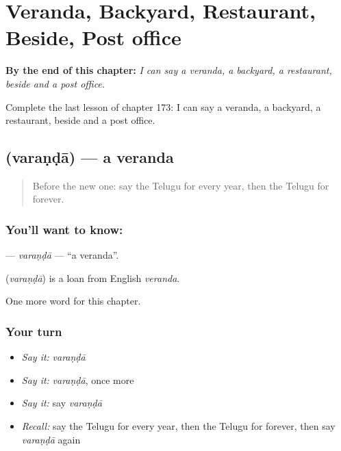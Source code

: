 
\chapter{Veranda, Backyard, Restaurant, Beside, Post office}
\label{ch:te-veranda-backyard-restaurant-beside-post-office}

\begin{chapteropening}
\textbf{By the end of this chapter:} \emph{I can say a veranda, a backyard, a restaurant, beside and a post office.}

Complete the last lesson of chapter 173: I can say a veranda, a backyard, a restaurant, beside and a post office.
\end{chapteropening}

\section[\texorpdfstring{\te{వరండా} (varaṇḍā)}{వరండా (varaṇḍā)}]{ (varaṇḍā) — a veranda}

\label{lesson:TE-C173-varanda}



\begin{quote}
Before the new one: say the Telugu for every year, then the Telugu for forever.
\end{quote}

\subsection*{You'll want to know: }
\textbf{} — \emph{varaṇḍā} — \textquotedblleft{}a veranda\textquotedblright{}.

\begin{cousinweb}
\textbf{} (\emph{varaṇḍā}) is a loan from English \emph{veranda}.
\end{cousinweb}

\begin{grammarlens}[title={What you've built}]
One more word for this chapter.
\end{grammarlens}

\subsection*{Your turn}
\begin{itemize}
\raggedright
  \item \emph{Say it:} \emph{varaṇḍā}
  \item \emph{Say it:} \emph{varaṇḍā}, once more
  \item \emph{Say it:} say \emph{varaṇḍā}
  \item \emph{Recall:} say the Telugu for every year, then the Telugu for forever, then say \emph{varaṇḍā} again
\end{itemize}

